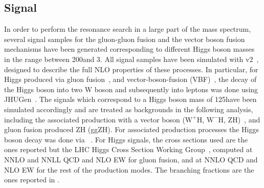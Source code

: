 \subsection*{Signal}  In order to perform the resonance search in a large part of the mass spectrum, several signal samples for the gluon-gluon fusion and the vector boson fusion mechanisms have been generated corresponding to different Higgs boson masses in the range between 200\GeV and 3\TeV. 
All signal samples have been simulated with \POWHEG v2~\cite{Nason:2004rx,Frixione:2007vw,Alioli:2010xd}, designed to describe the full NLO properties of these processes. In particular, for Higgs produced via gluon fusion~\cite{Alioli:2008tz}, and vector-boson-fusion (VBF)~\cite{Nason:2009ai},
the decay of the Higgs boson into two W boson and subsequently into leptons was done using JHUGen~\cite{jhugen}. 
The signals which correspond to a Higgs boson mass of 125\GeV have been simulated accordingly and are treated as backgrounds in the following analysis, including the associated production with a vector boson ($\mathrm{W^{+}H}$, $\mathrm{W^{-}H}$, ZH)~\cite{Luisoni:2013kna}, and gluon fusion produced ZH (ggZH). For associated production processes the Higgs boson decay was done via ~\cite{Sjostrand:2007gs}.
For Higgs signals, the cross sections used are the ones reported but the LHC Higgs Cross Section Working Group~\cite{temphiggsxsecs},
computed at NNLO and NNLL QCD and NLO EW for gluon fusion, and at NNLO QCD and NLO EW for the rest of the production modes.
The branching fractions are the ones reported in \cite{Heinemeyer:2013tqa}. 




